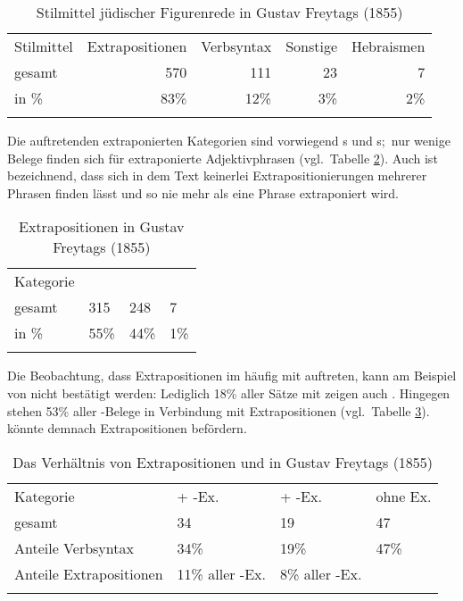  \begin{table}
   \centering
\begin{tabular}{lrrrr}
\lsptoprule
Stilmittel & Extrapositionen & Verbsyntax & Sonstige & Hebraismen \\ \cline{2-5}
gesamt & 570 & 111 & 23  & 7\\
in \% & 83\% & 12\% & 3\% & 2\%\\
\lspbottomrule
 \end{tabular}
 \caption{Stilmittel jüdischer Figurenrede in Gustav Freytags  (1855)}
  \label{tblSH1}
 \end{table} 
 
 Die auftretenden extraponierten Kategorien sind vorwiegend \hai{{\NP}}s und \hai{{\PP}}s;\, nur wenige Belege finden sich für extraponierte Adjektivphrasen (vgl.\, Tabelle \ref{tblSH2}). Auch ist bezeichnend, dass sich in dem Text keinerlei  Extrapositionierungen mehrerer Phrasen finden lässt und so nie mehr als eine Phrase extraponiert wird.  \,%
 
 \begin{table}
   \centering
\begin{tabular}{llll}
\lsptoprule
Kategorie & \hai{{\NP}} & \hai{{\PP}} & \hai{{\AP}} \\ \cline{2-4}
gesamt & 315 & 248 & 7  \\
in \% & 55\% & 44\% & 1\% \\
\lspbottomrule
 \end{tabular}
 \caption{Extrapositionen in Gustav Freytags  (1855)}
  \label{tblSH2}
 \end{table} 

\largerpage
Die Beobachtung, dass Extrapositionen im \hai{{\LiJieins}} häufig mit \hai{{\VR}} auftreten, kann am Beispiel von  nicht bestätigt werden: Lediglich 18\% aller Sätze mit  zeigen auch \hai{{\VR}}. Hingegen stehen 53\% aller \hai{{\VR}}-Belege in Verbindung mit Extrapositionen (vgl.\, Tabelle \ref{tblSH3}). \hai{{\VR}} könnte demnach Extrapositionen befördern.  
  
  \begin{table}
   \centering
\begin{tabular}{llll}
\lsptoprule
Kategorie & \hai{{\VR}} + \hai{{\NP}}-Ex. & \hai{{\VR}} + \hai{{\PP}}-Ex. & \hai{{\VR}} ohne
Ex. \\ \cline{2-4}
gesamt & 34 & 19 & 47  \\
Anteile Verbsyntax & 34\%&19\% & 47\%\\
Anteile Extrapositionen & 11\% aller \hai{{\NP}}-Ex. & 8\% aller \hai{{\PP}}-Ex.&  \\
\lspbottomrule
 \end{tabular}
 \caption{Das Verhältnis von Extrapositionen und \hai{{\VR}} in Gustav Freytags  (1855)}
  \label{tblSH3}
 \end{table} 
 
